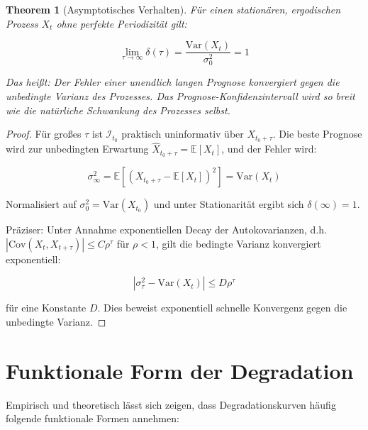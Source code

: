 \documentclass[12pt, a4paper, titlepage]{report}
\newtheorem{theorem}{Theorem}[section]
\theoremstyle{definition}
\theoremstyle{remark}
\newcommand{\E}{\mathbb{E}}
\newcommand{\Var}{\mathrm{Var}}
\newcommand{\Cov}{\mathrm{Cov}}
\begin{document}
\begin{theorem}[Asymptotisches Verhalten]
\label{thm:asymptotic}
Für einen stationären, ergodischen Prozess $X_t$ ohne perfekte Periodizität gilt:

\begin{equation}
\lim_{\tau \to \infty} \delta(\tau) = \frac{\Var(X_t)}{\sigma_0^2} = 1
\end{equation}

Das heißt: Der Fehler einer unendlich langen Prognose konvergiert gegen die unbedingte Varianz des Prozesses. Das Prognose-Konfidenzintervall wird so breit wie die natürliche Schwankung des Prozesses selbst.
\end{theorem}

\begin{proof}
Für großes $\tau$ ist $\mathcal{I}_{t_0}$ praktisch uninformativ über $X_{t_0+\tau}$. Die beste Prognose wird zur unbedingten Erwartung $\hat{X}_{t_0+\tau} = \E[X_t]$, und der Fehler wird:

\begin{equation}
\sigma_\infty^2 = \E[(X_{t_0+\tau} - \E[X_t])^2] = \Var(X_t)
\end{equation}

Normalisiert auf $\sigma_0^2 = \Var(X_{t_0})$ und unter Stationarität ergibt sich $\delta(\infty) = 1$.

Präziser: Unter Annahme exponentiellen Decay der Autokovarianzen, d.h. $|\Cov(X_t, X_{t+\tau})| \leq C \rho^\tau$ für $\rho < 1$, gilt die bedingte Varianz konvergiert exponentiell:

\begin{equation}
|\sigma_\tau^2 - \Var(X_t)| \leq D \rho^\tau
\end{equation}

für eine Konstante $D$. Dies beweist exponentiell schnelle Konvergenz gegen die unbedingte Varianz.
\end{proof}

\section{Funktionale Form der Degradation}

Empirisch und theoretisch lässt sich zeigen, dass Degradationskurven häufig folgende funktionale Formen annehmen:
\end{document}
